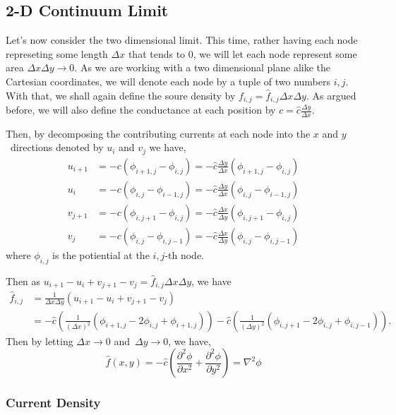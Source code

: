 \documentclass[]{article}
\begin{document}
\subsection{2-D Continuum Limit}\label{d-continuum-limit-1}

Let's now consider the two dimensional limit. This time, rather having
each node represeting some length \(\Delta x\) that tends to 0, we will
let each node represent some area \(\Delta x \Delta y \to 0\). As we are
working with a two dimensional plane alike the Cartesian coordinates, we
will denote each node by a tuple of two numbers \(i,j\). With that, we
shall again define the soure density by
\(f_{i,j} = \hat{f}_{i,j} \Delta x \Delta y\). As argued before, we will
also define the conductance at each position by
\(c = \hat{c} \frac{\Delta y}{\Delta x}\).

Then, by decomposing the contributing currents at each node into the
\(x\) and \(y\)~directions denoted by \(u_i\) and \(v_j\) we have, \[
\begin{split}
u_{i+1} & = -c(\phi_{i+1, j}- \phi_{i,j}) = -\hat{c}\frac{\Delta y}{\Delta x}(\phi_{i+1, j}- \phi_{i,j})\\
u_{i} & = -c(\phi_{i, j}- \phi_{i-1,j}) = -\hat{c}\frac{\Delta y}{\Delta x}(\phi_{i, j}- \phi_{i-1,j})\\
v_{j+1} & = -c(\phi_{i, j+1}- \phi_{i,j}) = -\hat{c}\frac{\Delta x}{\Delta y}(\phi_{i, j+1}- \phi_{i,j})\\
v_{j} & = -c(\phi_{i, j}- \phi_{i,j-1}) = -\hat{c}\frac{\Delta x}{\Delta y}(\phi_{i, j}- \phi_{i,j-1})
\end{split}
\] where \(\phi_{i,j}\) is the potiential at the \(i,j\)-th node.

Then as
\(u_{i+1} - u_{i} + v_{j+1} - v_{j} = \hat{f}_{i,j} \Delta x \Delta y\),
we have \[
\begin{split}
\hat{f}_{i,j} & = \frac{1}{\Delta x \Delta y}(u_{i+1} - u_{i} + v_{j+1} - v_{j})\\
& = -\hat{c}\left(\frac{1}{(\Delta x)^2} (\phi_{i+1,j} - 2 \phi_{i,j} + \phi_{i+1,j})\right) - \hat{c}\left(\frac{1}{(\Delta y)^2}(\phi_{i,j+1}- 2\phi_{i,j} + \phi_{i,j-1})\right).
\end{split}
\] Then by letting \(\Delta x \to 0\) and~\(\Delta y \to 0\), we have,
\[
\hat{f}(x, y) = -\hat{c}\left(\frac{\partial^2 \phi}{\partial x^2} + \frac{\partial^2 \phi}{\partial y^2}\right) = \nabla^2 \phi
\]

\subsubsection{Current Density}\label{current-density}
\end{document}
